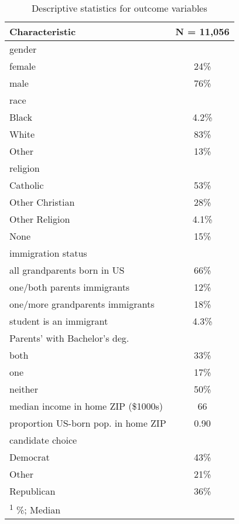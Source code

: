 \begin{table}[H]

\caption{\label{tab:descriptives_cat}Descriptive statistics for outcome variables}
\centering
\fontsize{9}{11}\selectfont
\begin{tabular}[t]{lc}
\toprule
\textbf{Characteristic} & \textbf{N = 11,056}\\
\midrule
gender & \\
\hspace{1em}female & 24\%\\
\hspace{1em}male & 76\%\\
race & \\
\hspace{1em}Black & 4.2\%\\
\hspace{1em}White & 83\%\\
\hspace{1em}Other & 13\%\\
religion & \\
\hspace{1em}Catholic & 53\%\\
\hspace{1em}Other Christian & 28\%\\
\hspace{1em}Other Religion & 4.1\%\\
\hspace{1em}None & 15\%\\
immigration status & \\
\hspace{1em}all grandparents born in US & 66\%\\
\hspace{1em}one/both parents immigrants & 12\%\\
\hspace{1em}one/more grandparents immigrants & 18\%\\
\hspace{1em}student is an immigrant & 4.3\%\\
Parents' with Bachelor's deg. & \\
\hspace{1em}both & 33\%\\
\hspace{1em}one & 17\%\\
\hspace{1em}neither & 50\%\\
median income in home ZIP (\$1000s) & 66\\
proportion US-born pop. in home ZIP & 0.90\\
candidate choice & \\
\hspace{1em}Democrat & 43\%\\
\hspace{1em}Other & 21\%\\
\hspace{1em}Republican & 36\%\\
\bottomrule
\multicolumn{2}{l}{\rule{0pt}{1em}\textsuperscript{1} \%; Median}\\
\end{tabular}
\end{table}
